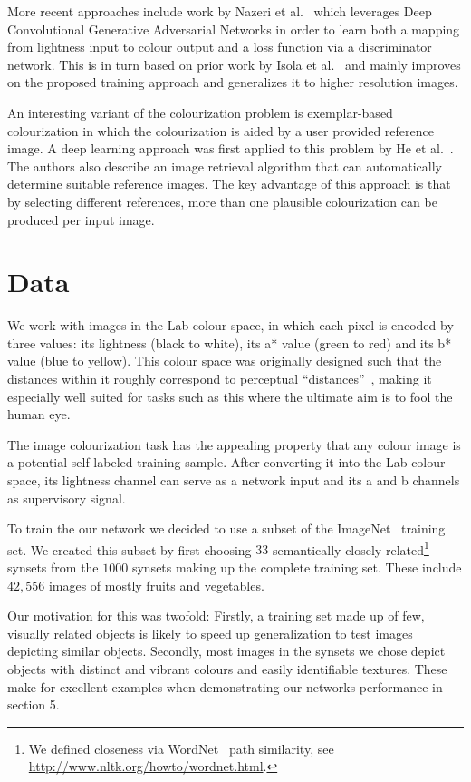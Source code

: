 \documentclass{article}
\begin{document}
More recent approaches include work by Nazeri et al.~\cite{Nazeri2018} which
leverages Deep Convolutional Generative Adversarial Networks in order to learn
both a mapping from lightness input to colour output and a loss function via a
discriminator network. This is in turn based on prior work by Isola et
al.~\cite{Isola2016} and mainly improves on the proposed training approach and
generalizes it to higher resolution images.

An interesting variant of the colourization problem is exemplar-based
colourization in which the colourization is aided by a user provided reference
image. A deep learning approach was first applied to this problem by He et
al.~\cite{He2018}. The authors also describe an image retrieval
algorithm that can automatically determine suitable reference images. The key
advantage of this approach is that by selecting different references, more than
one plausible colourization can be produced per input image.

\section{Data}

We work with images in the Lab colour space, in which each pixel is
encoded by three values: its lightness (black to white), its a* value (green
to red) and its b* value (blue to yellow). This colour space was originally
designed such that the distances within it roughly correspond to perceptual
``distances''~\cite{LAB}, making it especially well suited for tasks such as
this where the ultimate aim is to fool the human eye.

The image colourization task has the appealing property that any colour image is
a potential self labeled training sample. After converting it into the Lab
colour space, its lightness channel can serve as a network input and its a and
b channels as supervisory signal.

To train the our network we decided to use a subset of the
ImageNet~\cite{ImageNet} training set. We created this subset by first choosing
$33$ semantically closely related\footnote{We defined closeness via
WordNet~\cite{WordNet} path similarity, see
\href{http://www.nltk.org/howto/wordnet.html}{http://www.nltk.org/howto/wordnet.html}.}
synsets from the $1000$ synsets making up the complete training set. These
include $42,556$ images of mostly fruits and vegetables.

Our motivation for this was twofold: Firstly, a training set made up of few,
visually related objects is likely to speed up generalization to test images
depicting similar objects. Secondly, most images in the synsets we chose depict
objects with distinct and vibrant colours and easily identifiable textures.
These make for excellent examples when demonstrating our networks performance
in section 5.
\end{document}
